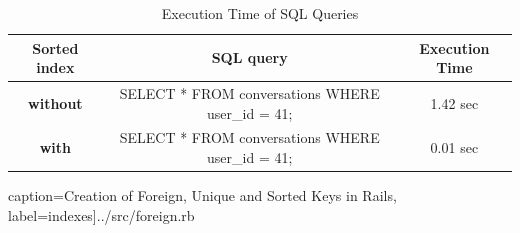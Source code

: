 \begin{table}[!ht]
\begin{center}
\caption{Execution Time of SQL Queries \cite{experiment_results}}
\begin{tabular}{| c | c | c |}
\hline
\textbf{Sorted index}& \textbf{SQL query} & \textbf{Execution Time} \\
\hline
\textbf{without} & SELECT * FROM conversations WHERE user\_id = 41; & 1.42 sec \\
\hline
\textbf{with} & SELECT * FROM conversations WHERE user\_id = 41;& 0.01 sec \\
\hline
\end{tabular}
\label{table:sql_results}
\vspace{-2.5em}
\end{center}
\end{table}


 caption={Creation of Foreign, Unique and Sorted Keys in Rails}, label=indexes]{../src/foreign.rb} 














